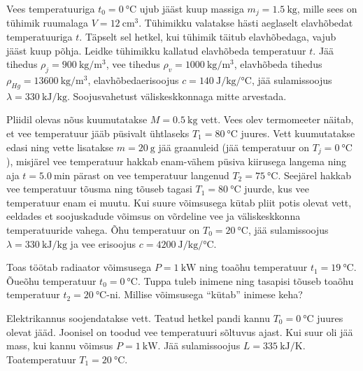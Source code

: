 \documentclass[a4paper,11pt,twocolumn]{article}
\begin{document}
\begin{question}[Lõppv 2018, P10]
	Vees temperatuuriga \( t_0=\SI{0}{\degreeCelsius} \) ujub jääst kuup massiga \( m_j=\SI{1,5}{\kilogram} \), mille sees on tühimik ruumalaga \( V = \SI{12}{\centi\meter\tothe{3}} \). Tühimikku valatakse hästi aeglaselt elavhõbedat temperatuuriga \( t \). Täpselt sel hetkel,	kui tühimik täitub elavhõbedaga, vajub jääst kuup põhja. Leidke tühimikku	kallatud elavhõbeda temperatuur \( t \). Jää tihedus \( \rho_j = \SI{900}{\kilogram\per\meter\cubed} \), vee	tihedus \( \rho_v = \SI{1000}{\kilogram\per\meter\cubed} \), elavhõbeda tihedus \( \rho_{Hg} = \SI{13600}{\kilogram\per\meter\cubed} \), elavhõbedaerisoojus \( c = \SI{140}{\joule\per\kilogram\per\degreeCelsius}\), jää sulamissoojus \( \lambda = \SI{330}{\kilo\joule\per\kilogram} \). Soojusvahetust väliskeskkonnaga mitte arvestada.
\end{question}
\begin{question}[Lõppv 2015, P7]
	Pliidil olevas nõus kuumutatakse \( M = \SI{0,5}{\kilogram} \) vett. Vees olev termomeeter näitab, et vee temperatuur jääb püsivalt ühtlaseks \( T_1 = \SI{80}{\degreeCelsius} \) juures. Vett kuumutatakse edasi ning vette lisatakse \( m = \SI{20}{\g} \) jää graanuleid (jää temperatuur on \( T_{j} = \SI{0}{\degreeCelsius} \)), misjärel vee temperatuur hakkab enam-vähem püsiva kiirusega langema ning aja \( t = \SI{5,0}{\minute} \) pärast on vee temperatuur langenud \( T_2 = \SI{75}{\degreeCelsius}\). Seejärel hakkab vee temperatuur tõusma ning tõuseb tagasi \( T_1 = \SI{80}{\degreeCelsius} \) juurde, kus vee temperatuur enam ei muutu. Kui suure võimsusega kütab pliit potis olevat vett, eeldades et soojuskadude võimsus on võrdeline vee ja väliskeskkonna temperatuuride vahega. Õhu temperatuur on \( T_0 = \SI{20}{\degreeCelsius} \), jää sulamissoojus \( \lambda = \SI{330}{\kilo\joule\per\kilogram} \) ja vee erisoojus \( c = \SI{4200}{\joule\per\kilogram\per\degreeCelsius}\).
\end{question}
\begin{question}
	Toas töötab radiaator võimsusega \( P=\SI{1}{\kilo\watt} \) ning toaõhu temperatuur \( t_1 = \SI{19}{\degreeCelsius} \). Õueõhu temperatuur \( t_0 = \SI{0}{\degreeCelsius} \). Tuppa tuleb inimene ning tasapisi tõuseb toaõhu temperatuur \( t_2 = \SI{20}{\degreeCelsius} \)-ni. Millise võimsusega “kütab” inimese keha?
\end{question}
\begin{question}[Lõppv 2004, G7][mat1][\columnwidth]
	Elektrikannus soojendatakse vett. Teatud hetkel pandi kannu \( T_0 = \SI{0}{\degreeCelsius}\) juures olevat jääd. Joonisel on toodud vee temperatuuri sõltuvus ajast. Kui suur oli jää mass, kui kannu võimsus \( P = \SI{1}{\kilo\watt}\). Jää sulamissoojus \( L = \SI{335}{\kilo\joule\per\kelvin}\). Toatemperatuur \( T_1 = \SI{20}{\degreeCelsius}\).
\end{question}
\end{document}
